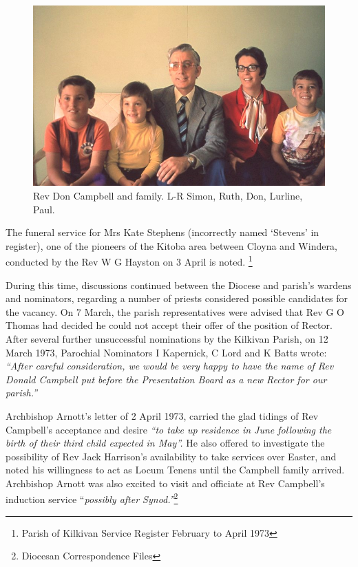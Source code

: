 \begin{figure}
\begin{center}
\includegraphics[width=1.\linewidth,center]{../images/DonCampbellAndFamily.png}
\caption{Rev Don Campbell and family. L-R Simon, Ruth, Don, Lurline, Paul.}
\end{center}
\end{figure}




The funeral service for Mrs Kate Stephens (incorrectly named `Stevens' in register), one of the pioneers of the Kitoba area between Cloyna and Windera, conducted by the Rev W G Hayston on 3 April is noted. \footnote{Parish of Kilkivan Service Register February to April 1973}


During this time, discussions continued between the Diocese and parish's wardens and nominators, regarding a number of priests considered possible candidates for the vacancy. On 7 March, the parish representatives were advised that Rev G O Thomas had decided he could not accept their offer of the position of Rector. After several further unsuccessful nominations by the Kilkivan Parish, on 12 March 1973, Parochial Nominators I Kapernick, C Lord and K Batts wrote: \emph{``After careful consideration, we would be very happy to have the name of Rev Donald Campbell put before the Presentation Board as a new Rector for our parish.''}



Archbishop Arnott's letter of 2 April 1973, carried the glad tidings of Rev Campbell's acceptance and desire \emph{``to take up residence in June following the birth of their third child expected in May''.} He also offered to investigate the possibility of Rev Jack Harrison's availability to take services over Easter, and noted his willingness to act as Locum Tenens until the Campbell family arrived. Archbishop Arnott was also excited to visit and officiate at Rev Campbell's induction service ``\emph{possibly after Synod.''}\footnote{Diocesan Correspondence Files}


